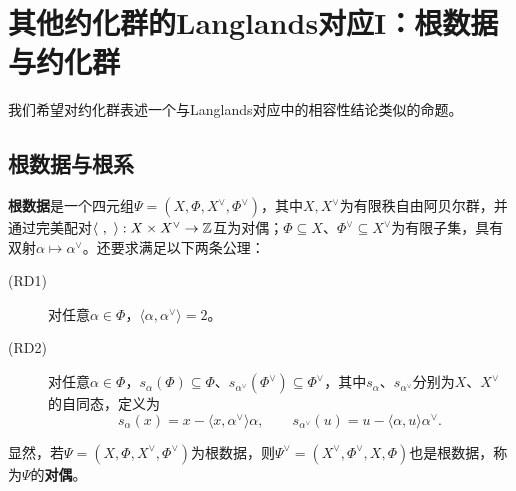 \chapter{其他约化群的Langlands对应I：根数据与约化群}\label{L18}
我们希望对约化群表述一个与Langlands对应中的相容性结论类似的命题。
\section{根数据与根系}\label{L18S1}
\begin{definition*}
\textbf{根数据}是一个四元组$\Psi=(X,\Phi,X^\vee,\Phi^\vee)$，其中$X,X^\vee$为有限秩自由阿贝尔群，并通过完美配对$\langle\ ,\ \rangle:X\times X^\vee\to\mathbb{Z}$互为对偶；$\Phi\subseteq X$、$\Phi^\vee\subseteq X^\vee$为有限子集，具有双射$\alpha\mapsto\alpha^\vee$。还要求满足以下两条公理：
\begin{description}
\item[(RD1)] 对任意$\alpha\in\Phi$，$\langle\alpha,\alpha^\vee\rangle=2$。
\item[(RD2)] 对任意$\alpha\in\Phi$，$s_\alpha(\Phi)\subseteq\Phi$、$s_{\alpha^\vee}(\Phi^\vee)\subseteq\Phi^\vee$，其中$s_\alpha$、$s_{\alpha^\vee}$分别为$X$、$X^\vee$的自同态，定义为
\begin{equation}\tag{1.1}\label{L18eq11}s_\alpha(x)=x-\langle x,\alpha^\vee\rangle\alpha,\qquad s_{\alpha^\vee}(u)=u-\langle\alpha,u\rangle\alpha^\vee.\end{equation}
\end{description}
\end{definition*}
显然，若$\Psi=(X,\Phi,X^\vee,\Phi^\vee)$为根数据，则$\Psi^\vee=(X^\vee,\Phi^\vee,X,\Phi)$也是根数据，称为$\Psi$的\textbf{对偶}。

